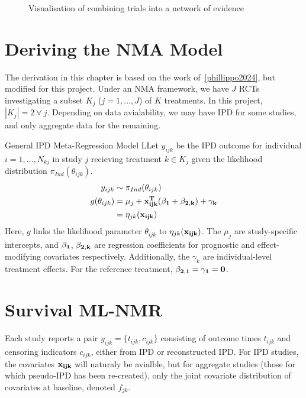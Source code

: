 \begin{figure}[h]
    \centering
    
    \caption{Visualisation of combining trials into a network of evidence}
    \label{fig:comb_evi}
\end{figure}

\section{Deriving the NMA Model}

The derivation in this chapter is based on the work of~\ref{phillippo2024}, but modified for this project. Under an NMA framework, we have $J$ RCTs investigating a subset $K_j$ ($j = 1, \ldots, J$) of $K$ treatments. In this project, $|K_j| = 2 \ \forall \ j$. Depending on data avialability, we may have IPD for some studies, and only aggregate data for the remaining. 

\begin{definition}{General IPD Meta-Regression Model}
    LLet $y_{ijk}$ be the IPD outcome for individual $i = 1, \ldots, N_{kj}$ in study $j$ recieving treatment $k \in K_j$ given the likelihood distribution $\pi_{Ind}(\theta_{ijk})$. 
    \begin{align*}
        y_{ijk} &\sim \pi_{Ind}(\theta_{ijk}) \\
        g(\theta_{ijk}) &= \mu_j + \bf{x}^T_{ijk}(\bf{\beta}_1 + \bf{\beta}_{2,k}) + \gamma_k \\
                        &= \eta_{jk}(\bf{x}_{ijk})
    \end{align*}
    Here, $g$ links the likelihood parameter $\theta_{ijk}$ to $\eta_{jk}(\bf{x}_{ijk})$. The $\mu_j$ are study-specific intercepts, and $\bf{\beta}_1$, $\bf{\beta}_{2,k}$ are regression coefficients for prognostic and effect-modifying covariates respectively. Additionally, the $\gamma_k$ are individual-level treatment effects. For the reference treatment, $\bf{\beta}_{2,1} = \gamma_1 = 0$.
    \label{def:mlnmrIPD}
\end{definition}

\section{Survival ML-NMR}
Each study reports a pair $y_{ijk} = \{t_{ijk}, c_{ijk}\}$ consisting of outcome times $t_{ijk}$ and censoring indicators $c_{ijk}$, either from IPD or reconstructed IPD. For IPD studies, the covariates $\bf{x}_{ijk}$ will naturaly be avialble, but for aggregate studies (those for which pseudo-IPD has been re-created), only the joint covariate distribution of covariates at baseline, denoted $f_{jk}$. \\

